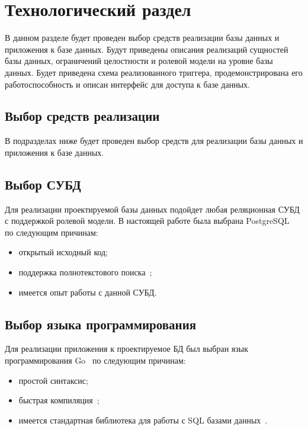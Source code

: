 \section{Технологический раздел}

В данном разделе будет проведен выбор средств реализации базы данных и приложения к базе данных.
Будут приведены описания реализаций сущностей базы данных, ограничений целостности и ролевой модели на уровне базы данных.
Будет приведена схема реализованного триггера, продемонстрирована его работоспособность и описан интерфейс для доступа к базе данных.

\subsection{Выбор средств реализации}

В подразделах ниже будет проведен выбор средств для реализации базы данных и приложения к базе данных.

\subsection*{Выбор СУБД}

Для реализации проектируемой базы данных подойдет любая реляционная СУБД с поддержкой ролевой модели.
В настоящей работе была выбрана PostgreSQL~\cite{psql} по следующим причинам:
\begin{itemize}
    \item открытый исходный код;
    \item поддержка полнотекстового поиска~\cite{psql};
    \item имеется опыт работы с данной СУБД.
\end{itemize}

\subsection*{Выбор языка программирования}

Для реализации приложения к проектируемое БД был выбран язык программирования Go~\cite{go} по следующим причинам:
\begin{itemize}
    \item простой синтаксис;
    \item быстрая компиляция~\cite{go};
    \item имеется стандартная библиотека для работы с SQL базами данных~\cite{gosql}.
\end{itemize}

